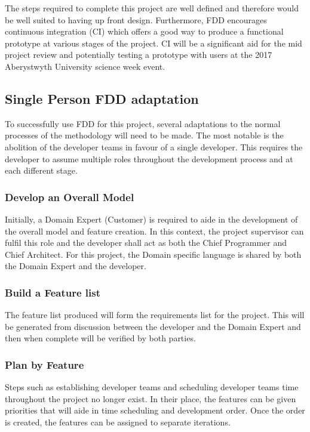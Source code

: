 The steps required to complete this project are well defined and therefore would be well suited to having up front design. Furthermore, FDD encourages continuous integration (CI) which offers  a good way to produce a functional prototype at various stages of the project. CI will be a significant aid for the mid project review and potentially testing a prototype with users at the 2017 Aberystwyth University science week event.

\subsection{Single Person FDD adaptation}
To successfully use FDD for this project, several adaptations to the normal processes of the methodology will need to be made. The most notable is the abolition of the developer teams in favour of a single developer. This requires the developer to assume multiple roles throughout the development process and at each different stage.

\subsubsection{Develop an Overall Model}
Initially, a Domain Expert (Customer) is required to aide in the development of the overall model and feature creation. In this context, the project supervisor can fulfil this role and the developer shall act as both the Chief Programmer and Chief Architect. For this project, the Domain specific language is shared by both the Domain Expert and the developer.

\subsubsection{Build a Feature list}
The feature list produced will form the requirements list for the project. This will be generated from discussion between the developer and the Domain Expert and then when complete will be verified by both parties.

\subsubsection{Plan by Feature}
Steps such as establishing developer teams and scheduling developer teams time throughout the project no longer exist. In their place, the features can be given priorities that will aide in time scheduling and development order. Once the order is created, the features can be assigned to separate iterations.

